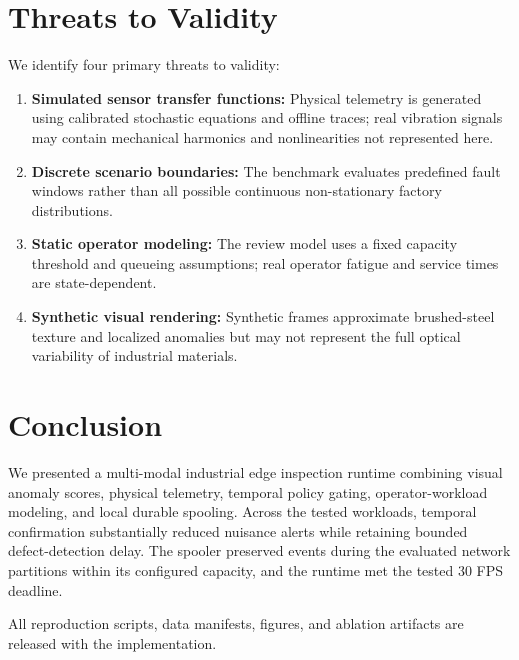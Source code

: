 \documentclass[conference]{IEEEtran}
\begin{document}
\section{Threats to Validity}
We identify four primary threats to validity:
\begin{enumerate}
    \item \textbf{Simulated sensor transfer functions:} Physical telemetry is generated using calibrated stochastic equations and offline traces; real vibration signals may contain mechanical harmonics and nonlinearities not represented here.
    \item \textbf{Discrete scenario boundaries:} The benchmark evaluates predefined fault windows rather than all possible continuous non-stationary factory distributions.
    \item \textbf{Static operator modeling:} The review model uses a fixed capacity threshold and queueing assumptions; real operator fatigue and service times are state-dependent.
    \item \textbf{Synthetic visual rendering:} Synthetic frames approximate brushed-steel texture and localized anomalies but may not represent the full optical variability of industrial materials.
\end{enumerate}

\section{Conclusion}
We presented a multi-modal industrial edge inspection runtime combining visual anomaly scores, physical telemetry, temporal policy gating, operator-workload modeling, and local durable spooling. Across the tested workloads, temporal confirmation substantially reduced nuisance alerts while retaining bounded defect-detection delay. The spooler preserved events during the evaluated network partitions within its configured capacity, and the runtime met the tested 30 FPS deadline.

All reproduction scripts, data manifests, figures, and ablation artifacts are released with the implementation.



\end{document}
